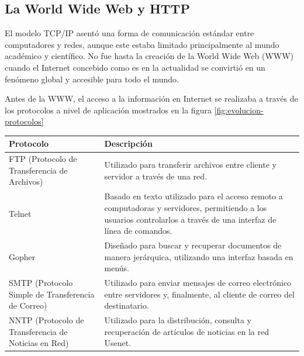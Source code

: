 \subsection{La World Wide Web y HTTP}
El modelo TCP/IP asentó una forma de comunicación estándar entre computadores y redes, aunque
este estaba limitado principalmente al mundo académico y científico. No fue hasta la creación de la World Wide Web (WWW)
cuando el Internet concebido como es en la actualidad se convirtió en un fenómeno global y accesible para todo el mundo.

Antes de la WWW, el acceso a la información en Internet se realizaba a través de los protocolos a nivel de aplicación mostrados en la figura \ref{fig:evolucion-protocolos}

\begin{table}[h]
      \small
      \centering
      \begin{tabular}{>{\raggedright}m{3cm}m{10cm}}
            \toprule
            \textbf{Protocolo}                                   & \textbf{Descripción}                                                                                                                                                \\
            \midrule
            FTP (Protocolo de Transferencia de Archivos)         & Utilizado para transferir archivos entre cliente y servidor a través de una red.                                                                                    \\
            \addlinespace
            Telnet                                               & Basado en texto utilizado para el acceso remoto a computadoras y servidores, permitiendo a los usuarios controlarlos a través de una interfaz de línea de comandos. \\
            \addlinespace
            Gopher                                               & Diseñado para buscar y recuperar documentos de manera jerárquica, utilizando una interfaz basada en menús.                                                          \\
            \addlinespace
            SMTP (Protocolo Simple de Transferencia de Correo)   & Utilizado para enviar mensajes de correo electrónico entre servidores y, finalmente, al cliente de correo del destinatario.                                         \\
            \addlinespace
            NNTP (Protocolo de Transferencia de Noticias en Red) & Utilizado para la distribución, consulta y recuperación de artículos de noticias en la red Usenet.                                                                  \\

\end{tabular}
\end{table}
